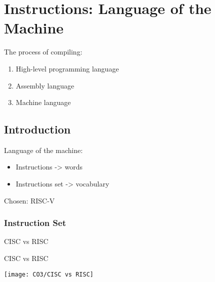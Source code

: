 \newpage
\section{Instructions: Language of the Machine}
The process of compiling:
\begin{enumerate}
    \item High-level programming language
    \item Assembly language
    \item Machine language
\end{enumerate}

\subsection{Introduction}
Language of the machine: \begin{itemize}
    \item\small Instructions -> words
    \item\small Instructions set -> vocabulary
\end{itemize}

Chosen: RISC-V

\subsubsection{Instruction Set}

CISC vs RISC

\begin{table}[!htb]
    \centering
    \caption{CISC vs RISC}
    \texttt{[image: CO3/CISC vs RISC]}
\end{table}



